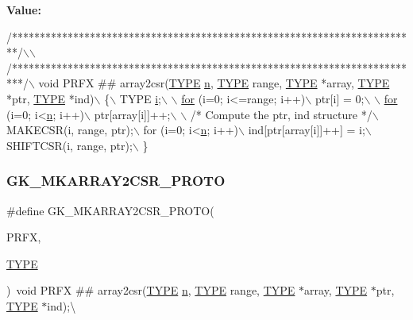 {\bfseries Value\+:}
\begin{DoxyCode}
\textcolor{comment}{/*************************************************************************/}\(\backslash\)\(\backslash\)
\textcolor{comment}{/**************************************************************************/}\(\backslash\)
void PRFX ## array2csr(\hyperlink{a00608_a0bc6723d5d4776ab7cdc646728b775f7}{TYPE} \hyperlink{a00563_a4c2d80ab32fc3a598413ae25e9f2bdce}{n}, \hyperlink{a00608_a0bc6723d5d4776ab7cdc646728b775f7}{TYPE} range, \hyperlink{a00608_a0bc6723d5d4776ab7cdc646728b775f7}{TYPE} *array, \hyperlink{a00608_a0bc6723d5d4776ab7cdc646728b775f7}{TYPE} *ptr, 
      \hyperlink{a00608_a0bc6723d5d4776ab7cdc646728b775f7}{TYPE} *ind)\(\backslash\)
\{\(\backslash\)
  TYPE \hyperlink{a01014_afb6aca53df96564f2adf086c942453ec}{i};\hyperlink{a00623_ad1e7380d51df1e0043d24d3c8a860e0a}{\(\backslash\)}
\hyperlink{a00623_ad1e7380d51df1e0043d24d3c8a860e0a}{\(\backslash\)}
\hyperlink{a00623_ad1e7380d51df1e0043d24d3c8a860e0a}{  for} (i=0; i<=range; i++)\(\backslash\)
    ptr[i] = 0;\hyperlink{a00623_ad1e7380d51df1e0043d24d3c8a860e0a}{\(\backslash\)}
\hyperlink{a00623_ad1e7380d51df1e0043d24d3c8a860e0a}{\(\backslash\)}
\hyperlink{a00623_ad1e7380d51df1e0043d24d3c8a860e0a}{  for} (i=0; i<\hyperlink{a00563_a4c2d80ab32fc3a598413ae25e9f2bdce}{n}; i++)\(\backslash\)
    ptr[array[i]]++;\(\backslash\)
\(\backslash\)
  \textcolor{comment}{/* Compute the ptr, ind structure */}\(\backslash\)
  MAKECSR(i, range, ptr);\(\backslash\)
  for (i=0; i<\hyperlink{a00563_a4c2d80ab32fc3a598413ae25e9f2bdce}{n}; i++)\(\backslash\)
    ind[ptr[array[i]]++] = i;\(\backslash\)
  SHIFTCSR(i, range, ptr);\(\backslash\)
\}
\end{DoxyCode}
\mbox{\label{a00074_a3639070206506cda0f6879678f5a2dcd}} 
\subsubsection{\texorpdfstring{G\+K\+\_\+\+M\+K\+A\+R\+R\+A\+Y2\+C\+S\+R\+\_\+\+P\+R\+O\+TO}{GK\_MKARRAY2CSR\_PROTO}}
{\footnotesize\ttfamily \#define G\+K\+\_\+\+M\+K\+A\+R\+R\+A\+Y2\+C\+S\+R\+\_\+\+P\+R\+O\+TO(\begin{DoxyParamCaption}\item[{}]{P\+R\+FX,  }\item[{}]{\hyperlink{a00608_a0bc6723d5d4776ab7cdc646728b775f7}{T\+Y\+PE} }\end{DoxyParamCaption})~void P\+R\+FX \#\# array2csr(\hyperlink{a00608_a0bc6723d5d4776ab7cdc646728b775f7}{T\+Y\+PE} \hyperlink{a00623_a781a04ab095280f838ff3eb0e51312e0}{n}, \hyperlink{a00608_a0bc6723d5d4776ab7cdc646728b775f7}{T\+Y\+PE} range, \hyperlink{a00608_a0bc6723d5d4776ab7cdc646728b775f7}{T\+Y\+PE} $\ast$array, \hyperlink{a00608_a0bc6723d5d4776ab7cdc646728b775f7}{T\+Y\+PE} $\ast$ptr, \hyperlink{a00608_a0bc6723d5d4776ab7cdc646728b775f7}{T\+Y\+PE} $\ast$ind);\textbackslash{}}

